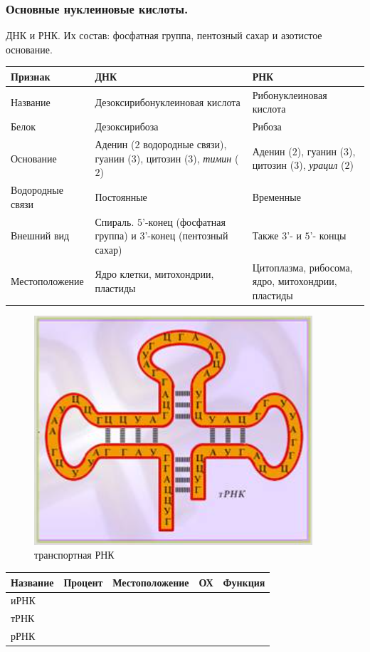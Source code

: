 \documentclass[12pt]{article}
\begin{document}
	\subsubsection{Основные нуклеиновые кислоты.}
	ДНК и РНК. Их состав: фосфатная группа, пентозный сахар и азотистое основание.
	\begin{xltabular}{\textwidth}{|X|X|X|}
		\hline
		Признак & ДНК & РНК \\
		\hline
		Название & Дезоксирибонуклеиновая кислота & Рибонуклеиновая кислота \\
		\hline
		Белок & Дезоксирибоза & Рибоза \\
		\hline
		Основание & Аденин ($2$ водородные связи), гуанин ($3$), цитозин ($3$), \textit{тимин} ($2$) & Аденин ($2$), гуанин ($3$), цитозин ($3$), \textit{урацил} ($2$) \\
		\hline
		Водородные связи & Постоянные & Временные \\
		\hline
		Внешний вид & Спираль. $5$'-конец (фосфатная группа) и $3$'-конец (пентозный сахар) & Также $3$'- и $5$'- концы \\
		\hline
		Местоположение & Ядро клетки, митохондрии, пластиды & Цитоплазма, рибосома, ядро, митохондрии, пластиды \\
		\hline
	\end{xltabular}	\begin{figure}[H]
		\includegraphics[height=0.25\textwidth]{extra-materials/тРНК}
		\caption{транспортная РНК}
	\end{figure}
	\begin{xltabular}{\textwidth}{|X|X|X|X|X|}
		\hline
		Название & Процент & Местоположение & ОХ & Функция \\
		\hline
		иРНК &  &  &  &  \\
		\hline
		тРНК &  &  &  &  \\
		\hline
		рРНК &  &  &  &  \\
		\hline
	\end{xltabular}
\end{document}
